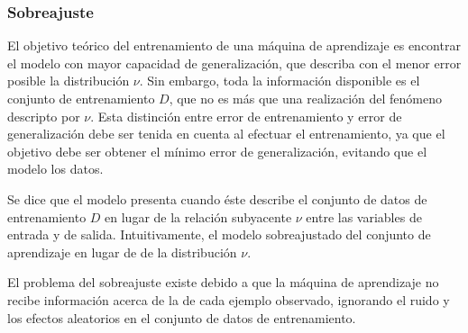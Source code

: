 %
\subsubsection{Sobreajuste}
%
El objetivo teórico del entrenamiento de una máquina de aprendizaje es
encontrar el modelo con mayor capacidad de generalización, que
describa con el menor error posible la distribución $\nu$.
Sin embargo, toda la información disponible es el conjunto de
entrenamiento $D$, que no es más que una realización del fenómeno
descripto por $\nu$.
Esta distinción entre error de entrenamiento y
error de generalización debe ser tenida en cuenta al efectuar el
entrenamiento, ya que el objetivo debe ser obtener el mínimo error de
generalización, evitando que el modelo  los datos.

Se dice que el modelo presenta  cuando éste describe
el conjunto de datos de entrenamiento $D$ en lugar de la relación
subyacente $\nu$ entre las variables de entrada y de salida.
Intuitivamente, el modelo sobreajustado
 del conjunto de aprendizaje en lugar de
 de la distribución $\nu$.

El problema del
sobreajuste existe debido a que la máquina de aprendizaje no recibe
información acerca de la  de cada ejemplo observado,
ignorando el ruido y los efectos aleatorios en el conjunto de datos de
entrenamiento.
